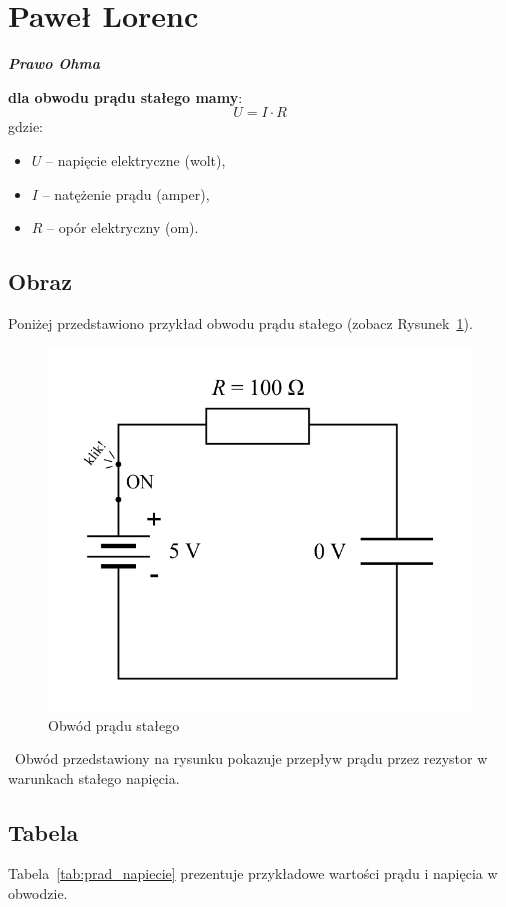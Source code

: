 
\section{Paweł Lorenc}
\label{sec:plorenc}



\textbf{\textit{Prawo Ohma}}

\centering \textbf{dla obwodu prądu stałego mamy}:
\begin{equation}
    U = I \cdot R
\end{equation}
gdzie:
\begin{itemize}
    \item \(U\) – napięcie elektryczne (wolt),
    \item \(I\) – natężenie prądu (amper),
    \item \(R\) – opór elektryczny (om).
\end{itemize}

\subsection{Obraz}
Poniżej przedstawiono przykład obwodu prądu stałego (zobacz Rysunek~\ref{fig:obwod}). 

\begin{figure}[htp]
    \centering
    \includegraphics[width=0.5\linewidth]{pictures/zamkniecie-obwodu-kondensatora.png}
    \caption{Obwód prądu stałego}
    \label{fig:obwod}
\end{figure}
\
Obwód przedstawiony na rysunku pokazuje przepływ prądu przez rezystor w warunkach stałego napięcia.

\newpage

\subsection{Tabela}
Tabela~\ref{tab:prad_napiecie} prezentuje przykładowe wartości prądu i napięcia w obwodzie.


\label{tab:tabelkaPL}



